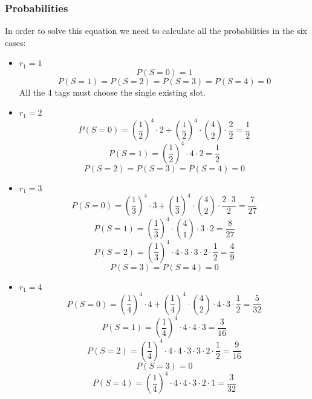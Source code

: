 \subsubsection{Probabilities}
In order to solve this equation we need to calculate all the probabilities in the six cases:
\begin{itemize}
\item $r_1 = 1$
\begin{equation}
P(S=0) = 1
\end{equation}
\begin{equation}
P(S=1) = P(S=2) = P(S=3) = P(S=4) = 0
\end{equation}
All the 4 tags must choose the single existing slot.

\item $r_1 = 2$
\begin{equation}
P(S=0) = (\frac{1}{2})^4 \cdot 2 +  (\frac{1}{2})^4 \cdot \binom{4}{2} \cdot \frac{2}{2} = \frac{1}{2}
\end{equation}
\begin{equation}
P(S=1) = (\frac{1}{2})^4 \cdot 4 \cdot 2 = \frac{1}{2}
\end{equation}
\begin{equation}
P(S=2) = P(S=3) = P(S=4) = 0
\end{equation}

\item $r_1 = 3$
\begin{equation}
P(S=0) = (\frac{1}{3})^4 \cdot 3 +  (\frac{1}{3})^4 \cdot \binom{4}{2} \cdot \frac{2 \cdot 3}{2} = \frac{7}{27}
\end{equation}
\begin{equation}
P(S=1) = (\frac{1}{3})^4 \cdot \binom{4}{1} \cdot 3 \cdot 2 = \frac{8}{27}
\end{equation}
\begin{equation}
P(S=2) = (\frac{1}{3})^4 \cdot 4 \cdot 3 \cdot 3 \cdot 2 \cdot \frac{1}{2} = \frac{4}{9}
\end{equation}
\begin{equation}
P(S=3) = P(S=4) = 0
\end{equation}

\item $r_1 = 4$
\begin{equation}
P(S=0) = (\frac{1}{4})^4 \cdot 4 +  (\frac{1}{4})^4 \cdot \binom{4}{2} \cdot 4 \cdot 3 \cdot \frac{1}{2} = \frac{5}{32}
\end{equation}
\begin{equation}
P(S=1) = (\frac{1}{4})^4 \cdot 4 \cdot 4 \cdot 3 = \frac{3}{16}
\end{equation}
\begin{equation}
P(S=2) = (\frac{1}{4})^4 \cdot 4 \cdot 4 \cdot 3 \cdot 3 \cdot 2 \cdot \frac{1}{2} = \frac{9}{16}
\end{equation}
\begin{equation}
P(S=3) = 0
\end{equation}
\begin{equation}
P(S=4) = (\frac{1}{4})^4 \cdot 4 \cdot 4 \cdot 3 \cdot 2 \cdot 1 = \frac{3}{32}
\end{equation}


\end{itemize}
